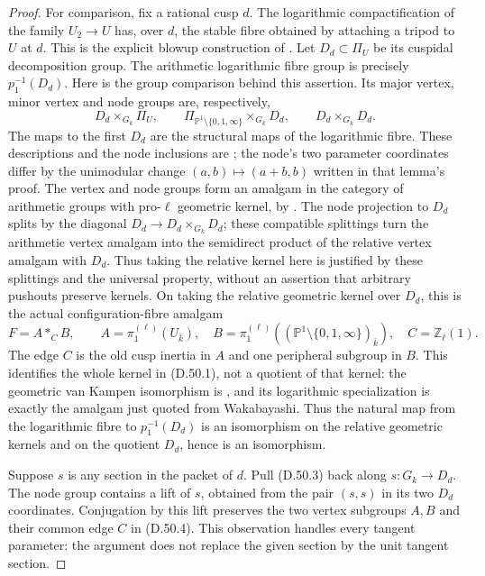 \begin{proof}
For comparison, fix a rational cusp \(d\).
The logarithmic compactification of the family
\(U_2\to U\) has, over \(d\), the stable fibre
obtained by attaching a tripod to \(U\) at \(d\).
This is the explicit blowup construction of
\cite[Section 2, pp.~14--16]{DE_Wakabayashi2012}.
Let \(D_d\subset\Pi_U\) be its cuspidal decomposition
group. The arithmetic logarithmic fibre group
is precisely \(p_1^{-1}(D_d)\).
Here is the group comparison behind this assertion.
Its major vertex, minor vertex and node groups are,
respectively,
\[
 D_d\times_{G_k}\Pi_U,\qquad
 \Pi_{\mathbb P^1\setminus\{0,1,\infty\}}
       \times_{G_k}D_d,\qquad
 D_d\times_{G_k}D_d .                                          \tag{D.50.3}
\]
The maps to the first \(D_d\) are the structural
maps of the logarithmic fibre. These descriptions
and the node inclusions are
\cite[Lemma 4.1]{DE_Wakabayashi2012};
the node's two parameter coordinates differ by
the unimodular change \((a,b)\mapsto(a+b,b)\)
written in that lemma's proof.
The vertex and node groups form an amalgam
in the category of arithmetic groups with pro-\(\ell\)
geometric kernel, by
\cite[Lemma 4.2(ii)]{DE_Wakabayashi2012}.
The node projection to \(D_d\) splits by the
diagonal \(D_d\to D_d\times_{G_k}D_d\);
these compatible splittings turn the arithmetic
vertex amalgam into the semidirect product of
the relative vertex amalgam with \(D_d\).
Thus taking the relative kernel here is justified
by these splittings and the universal property,
without an assertion that arbitrary pushouts
preserve kernels.
On taking the relative geometric kernel over \(D_d\),
this is the actual configuration-fibre amalgam
\[
 F=A*_{C}B,\qquad
 A=\pi_1^{(\ell)}(U_{\bar k}),\quad
 B=\pi_1^{(\ell)}
       ((\mathbb P^1\setminus\{0,1,\infty\})_{\bar k}),
 \quad C=\mathbb Z_\ell(1).                                   \tag{D.50.4}
\]
The edge \(C\) is the old cusp inertia in \(A\)
and one peripheral subgroup in \(B\).
This identifies the whole kernel in (D.50.1),
not a quotient of that kernel: the geometric
van Kampen isomorphism is
\cite[Definition 1.4 and
Proposition 1.5(iii)]{DE_Mochizuki2010},
and its logarithmic specialization is exactly
the amalgam just quoted from Wakabayashi.
Thus the natural map from the logarithmic fibre
to \(p_1^{-1}(D_d)\) is an isomorphism on
the relative geometric kernels and on the quotient
\(D_d\), hence is an isomorphism.

Suppose \(s\) is any section in the packet of \(d\).
Pull (D.50.3) back along \(s:G_k\to D_d\).
The node group contains a lift of \(s\), obtained
from the pair \((s,s)\) in its two \(D_d\) coordinates.
Conjugation by this lift preserves the two
vertex subgroups \(A,B\) and their common edge
\(C\) in (D.50.4).
This observation handles every tangent parameter:
the argument does not replace the given section
by the unit tangent section.


\end{proof}

